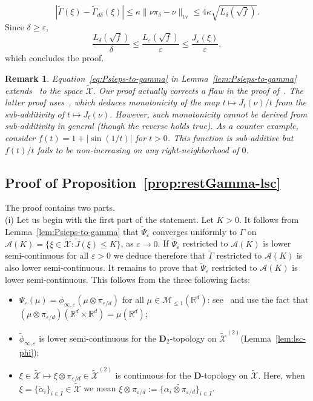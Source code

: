 \documentclass[a4paper,11pt]{amsart}
\numberwithin{equation}{section}
\newtheorem{remark}[theorem]{Remark}
\newcommand{\bbR}{{\ensuremath{\mathbb R}} }
\newcommand{\cA}{{\ensuremath{\mathcal A}} }
\newcommand{\cM}{{\ensuremath{\mathcal M}} }
\newcommand{\cX}{{\ensuremath{\mathcal X}} }
\newcommand{\gd}{\delta}
\newcommand{\gep}{\varepsilon}
\newcommand{\gk}{\kappa}
\newcommand{\bfD}{\mathbf{D}}
\renewcommand{\tilde}{\widetilde}          %
\newcommand{\8}{\infty}
\newcommand{\beq}{\begin{equation}}
\newcommand{\eeq}{\end{equation}}
\newcommand{\tv}{\mathrm{tv}}
\begin{document}
\beq
|\tilde\Gamma(\xi) - \tilde\Gamma_{ d\gd}(\xi)| \le \gk\|\nu\pi_\gd - \nu\|_{\tv} \le 4\gk\sqrt{L_\gd(\sqrt{f})}.
\eeq
Since $\gd \ge \gep$,
\beq
\frac{L_\gd(\sqrt{f})}{\gd}\le  \frac{L_\gep(\sqrt{f})}{\gep}\le  \frac{J_\gep(\xi)}{\gep},
\eeq
which concludes the proof.
%
\begin{remark}\label{rmk:fixlemmaBBH}
Equation~\eqref{eq:Psieps-to-gamma} in Lemma~\ref{lem:Psieps-to-gamma} extends~\cite[Lemma 7]{BBH2001} to the space $\tilde{\cX}$. Our proof actually corrects a flaw in the proof of~\cite[Lemma 7]{BBH2001}. The latter proof uses~\cite[Lemma 5(b)]{BBH2001}, which deduces monotonicity of the map $t\mapsto J_t(\nu)/t$ from the sub-additivity of $t \mapsto J_t(\nu)$. However, such monotonicity cannot be derived from sub-additivity in general (though the reverse holds true). As a counter example, consider $f(t) = 1 + |\sin(1/t)|$ for $t>0$. This function is sub-additive but $f(t)/t$ fails to be non-increasing on any right-neighborhood of $0$.
\end{remark}

\subsection{Proof of Proposition~\ref{prop:restGamma-lsc}}\label{S:gammalsc}
The proof contains two parts.\\
(i) Let us begin with the first part of the statement. Let $K>0$. It follows from Lemma~\ref{lem:Psieps-to-gamma} that $\tilde\Psi_\gep$ converges uniformly to $\Gamma$ on $\cA(K) = \{\xi \in \tilde \cX\colon \tilde J(\xi) \le K\}$, as $\gep\to 0$. If $\tilde\Psi_\gep$ restricted to $\cA(K)$ is lower semi-continuous for all $\gep>0$ we deduce therefore that $\tilde\Gamma$ restricted to $\cA(K)$ is also lower semi-continuous. It remains to prove that $\tilde\Psi_\gep$ restricted to $\cA(K)$ is lower semi-continuous. This follows from the three following facts:
	\begin{itemize}
		\item $\Psi_\gep(\mu) = \phi_{\infty,\gep}(\mu \otimes \pi_{ \gep/d})$ for all $\mu\in \cM_{\leq 1}(\bbR^d)$: see~\cite[Proof of Lemma 6]{BBH2001} and use the fact that $(\mu\otimes \pi_{ \gep/d})(\bbR^d\times\bbR^d) = \mu(\bbR^d)$; 
		\item $\tilde\phi_{\infty,\gep}$ is lower semi-continuous for the $\bfD_2$-topology on $\tilde\cX^{(2)}$(Lemma~\ref{lem:lsc-phi});
		\item $\xi \in \tilde\cX \mapsto \xi\otimes \pi_{ \gep/d} \in \tilde\cX^{(2)}$ is continuous for the $\bfD$-topology on $\tilde\cX$. Here, when $\xi=\{\tilde{\alpha}_i\}_{i\in I}\in\tilde\cX$ we mean $\xi\otimes \pi_{ \gep/d}:=\{\tilde{\alpha_i\otimes \pi_{ \gep/d}}\}_{i\in I}$.
	\end{itemize}
\end{document}
